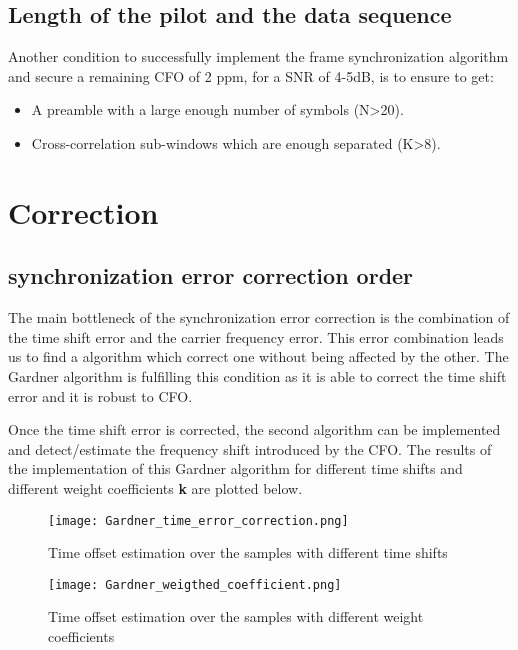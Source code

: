 \subsection{Length of the pilot and the data sequence}

Another condition to successfully implement the frame synchronization algorithm and secure a remaining 
CFO of 2 ppm, for a SNR of 4-5dB, is to ensure to get:
\begin{itemize}
    \item A preamble with a large enough number of symbols (N>20).
    \item Cross-correlation sub-windows which are enough separated (K>8).  
\end{itemize}

\section{Correction}

\subsection{synchronization error correction order}

The main bottleneck of the synchronization error correction is the combination of the time shift error and the carrier frequency error. This error combination leads us to find a algorithm which correct one without being affected by the other. The Gardner algorithm is fulfilling this condition as it is able to correct the time shift error and it is robust to CFO. \par
Once the time shift error is corrected, the second algorithm can be implemented and detect/estimate the frequency shift introduced by the CFO. The results of the implementation of this Gardner algorithm for different time shifts and different weight coefficients \textbf{k} are plotted below.

\begin{figure}[H]
    \centering
    \texttt{[image: Gardner\_time\_error\_correction.png]}
    \caption{Time offset estimation over the samples with different time shifts}
    \label{fig:Gardner_time_error_correction}
\end{figure}

\begin{figure}[H]
    \centering
    \texttt{[image: Gardner\_weigthed\_coefficient.png]}
    \caption{Time offset estimation over the samples with different weight coefficients}
    \label{fig:Gardner_weigthed_coefficient}
\end{figure}

